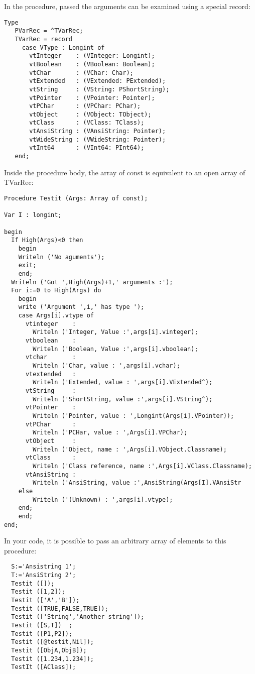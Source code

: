\documentclass{report}
\begin{document}
In the procedure, passed the arguments can be examined using a special 
record:
\begin{verbatim}
Type
   PVarRec = ^TVarRec;
   TVarRec = record   
     case VType : Longint of
       vtInteger    : (VInteger: Longint);
       vtBoolean    : (VBoolean: Boolean);
       vtChar       : (VChar: Char);
       vtExtended   : (VExtended: PExtended);
       vtString     : (VString: PShortString);
       vtPointer    : (VPointer: Pointer);
       vtPChar      : (VPChar: PChar);
       vtObject     : (VObject: TObject);
       vtClass      : (VClass: TClass);  
       vtAnsiString : (VAnsiString: Pointer);   
       vtWideString : (VWideString: Pointer);  
       vtInt64      : (VInt64: PInt64);
   end;
\end{verbatim}
Inside the procedure body, the array of const is equivalent to 
an open array of TVarRec:
\begin{verbatim}
Procedure Testit (Args: Array of const);

Var I : longint;

begin
  If High(Args)<0 then
    begin
    Writeln ('No aguments');
    exit;
    end;
  Writeln ('Got ',High(Args)+1,' arguments :');
  For i:=0 to High(Args) do
    begin
    write ('Argument ',i,' has type ');
    case Args[i].vtype of
      vtinteger    : 
        Writeln ('Integer, Value :',args[i].vinteger);
      vtboolean    : 
        Writeln ('Boolean, Value :',args[i].vboolean);
      vtchar       : 
        Writeln ('Char, value : ',args[i].vchar);
      vtextended   : 
        Writeln ('Extended, value : ',args[i].VExtended^);
      vtString     : 
        Writeln ('ShortString, value :',args[i].VString^);
      vtPointer    : 
        Writeln ('Pointer, value : ',Longint(Args[i].VPointer));
      vtPChar      : 
        Writeln ('PCHar, value : ',Args[i].VPChar);
      vtObject     : 
        Writeln ('Object, name : ',Args[i].VObject.Classname);
      vtClass      : 
        Writeln ('Class reference, name :',Args[i].VClass.Classname);
      vtAnsiString : 
        Writeln ('AnsiString, value :',AnsiString(Args[I].VAnsiStr
    else
        Writeln ('(Unknown) : ',args[i].vtype);
    end;
    end;
end;
\end{verbatim}
In your code, it is possible to pass an arbitrary array of elements
to this procedure:
\begin{verbatim}
  S:='Ansistring 1';
  T:='AnsiString 2';
  Testit ([]);
  Testit ([1,2]);
  Testit (['A','B']);
  Testit ([TRUE,FALSE,TRUE]);
  Testit (['String','Another string']);
  Testit ([S,T])  ;
  Testit ([P1,P2]);
  Testit ([@testit,Nil]);
  Testit ([ObjA,ObjB]);  
  Testit ([1.234,1.234]);
  TestIt ([AClass]);
\end{verbatim}
\end{document}
